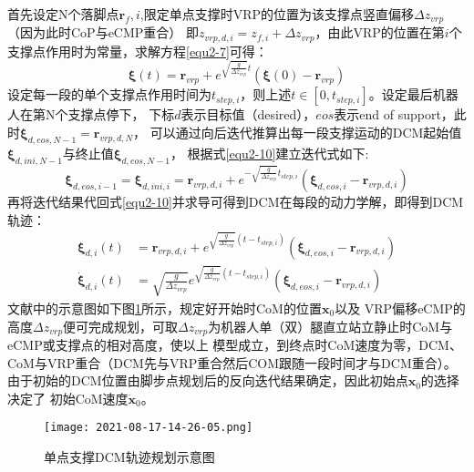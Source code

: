             首先设定N个落脚点$\boldsymbol{r}_f,i$,限定单点支撑时VRP的位置为该支撑点竖直偏移$\varDelta z_{vrp}$（因为此时CoP与eCMP重合）
            即$z_{vrp,d,i}=z_{f,i}+\varDelta z_{vrp}$，由此VRP的位置在第$i$个支撑点作用时为常量，求解方程\ref{equ2-7}可得：
            \begin{equation}
                \boldsymbol{\xi }\left( t \right) =\boldsymbol{r}_{vrp}+e^{\sqrt{\frac{g}{\varDelta z_{vrp}}}t}\left( \boldsymbol{\xi }\left( 0 \right) -\boldsymbol{r}_{vrp} \right)
                \label{equ2-10}
            \end{equation}
            设定每一段的单个支撑点作用时间为$t_{step,i}$，则上述$t\in \left[ 0,t_{step,i} \right]$。设定最后机器人在第N个支撑点停下，
            下标$d$表示目标值（desired），$eos$表示end of support，此时$\boldsymbol{\xi}_{d,eos,N-1}=\boldsymbol{r}_{vrp,d,N}$，
            可以通过向后迭代推算出每一段支撑运动的DCM起始值$\boldsymbol{\xi}_{d,ini,N-1}$与终止值$\boldsymbol{\xi}_{d,eos,N-1}$，
            根据式\ref{equ2-10}建立迭代式如下:
            \begin{equation}
                \boldsymbol{\xi }_{d,eos,i-1}=\boldsymbol{\xi }_{d,ini,i}=\boldsymbol{r}_{vrp,d,i}+e^{-\sqrt{\frac{g}{\varDelta z_{vrp}}}t_{step,i}}\left( \boldsymbol{\xi }_{d,eos,i}-\boldsymbol{r}_{vrp,d,i} \right) 
                \label{equ2-11}
            \end{equation}
            再将迭代结果代回式\ref{equ2-10}并求导可得到DCM在每段的动力学解，即得到DCM轨迹：
            \begin{subequations}
                \begin{align}
                    \boldsymbol{\xi }_{d,i}\left( t \right) &=\boldsymbol{r}_{vrp,d,i}+e^{\sqrt{\frac{g}{\varDelta z_{vrp}}}\left( t-t_{step,i} \right)}\left( \boldsymbol{\xi }_{d,eos,i}-\boldsymbol{r}_{vrp,d,i} \right) 
                    \label{equ2-12a}\\
                    \boldsymbol{\dot{\xi}}_{d,i}\left( t \right) &=\sqrt{\frac{g}{\varDelta z_{vrp}}}e^{\sqrt{\frac{g}{\varDelta z_{vrp}}}\left( t-t_{step,i} \right)}\left( \boldsymbol{\xi }_{d,eos,i}-\boldsymbol{r}_{vrp,d,i} \right) 
                    \label{equ2-12b}
                \end{align}
            \end{subequations}
            文献\cite{englsbergerThreedimensionalBipedalWalking2013}中的示意图如下图\ref{fig2-3}所示，规定好开始时CoM的位置$\boldsymbol{x}_0$以及
            VRP偏移eCMP的高度$\varDelta z_{vrp}$便可完成规划，可取$\varDelta z_{vrp}$为机器人单（双）腿直立站立静止时CoM与eCMP或支撑点的相对高度，使以上
            模型成立，到终点时CoM速度为零，DCM、CoM与VRP重合（DCM先与VRP重合然后COM跟随一段时间才与DCM重合）。由于初始的DCM位置由脚步点规划后的反向迭代结果确定，因此初始点$\boldsymbol{x}_0$的选择决定了
            初始CoM速度$\boldsymbol{\dot{x}}_0$。
            \begin{figure}[h] 
                \centering
                \texttt{[image: 2021-08-17-14-26-05.png]}
                \caption{单点支撑DCM轨迹规划示意图} \label{fig2-3}
            \end{figure}

